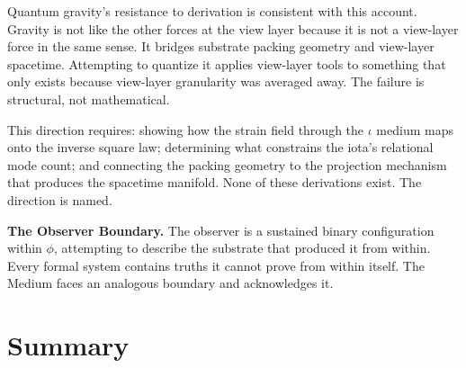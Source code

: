 \documentclass[11pt,letterpaper]{article}
\begin{document}
Quantum gravity's resistance to derivation is consistent with this account. Gravity is not like the other forces at the view layer because it is not a view-layer force in the same sense. It bridges substrate packing geometry and view-layer spacetime. Attempting to quantize it applies view-layer tools to something that only exists because view-layer granularity was averaged away. The failure is structural, not mathematical.

This direction requires: showing how the strain field through the \(\iota\) medium maps onto the inverse square law; determining what constrains the iota's relational mode count; and connecting the packing geometry to the projection mechanism that produces the spacetime manifold. None of these derivations exist. The direction is named.

\textbf{The Observer Boundary.} The observer is a sustained binary configuration within \(\phi\), attempting to describe the substrate that produced it from within. Every formal system contains truths it cannot prove from within itself. The Medium faces an analogous boundary and acknowledges it.


\section{Summary}
\label{sec:org7d1f8b1}
\end{document}

